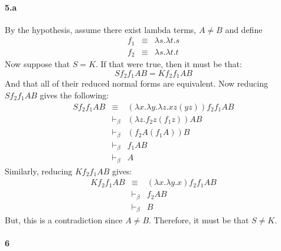 \documentclass{article}
\begin{document}
\paragraph{5.a}
By the hypothesis, assume there exist lambda terms, $A \neq B$ and define 
\begin{eqnarray*}
f_1 & \equiv & \lambda s. \lambda t. s \\
f_2 & \equiv & \lambda s. \lambda t. t
\end{eqnarray*}
Now suppose that $S = K$.  If that were true, then it must be that:
\[ S f_2 f_1 A B = K f_2 f_1 A B \]
And that all of their reduced normal forms are equivalent.  Now reducing $S f_2 f_1 A B$ gives the following:
\begin{eqnarray*}
S f_2 f_1 A B & \equiv & (\lambda x . \lambda y . \lambda z . x z (y z) ) f_2 f_1 A B \\
& \vdash_\beta & (\lambda z . f_2 z (f_1 z)) A B \\
& \vdash_\beta & (f_2 A (f_1 A)) B \\
& \vdash_\beta & f_1 A B \\
& \vdash_\beta & A
\end{eqnarray*}
Similarly, reducing $K f_2 f_1 A B$ gives:
\begin{eqnarray*}
K f_2 f_1 A B & \equiv & ( \lambda x . \lambda y . x ) f_2 f_1 A B \\
& \vdash_\beta & f_2 A B \\
& \vdash_\beta & B
\end{eqnarray*}
But, this is a contradiction since $A \neq B$.  Therefore, it must be that $S \neq K$.

\paragraph{6}
\newcommand{\Plus}{\mathop{\underline{Plus}} \:}
\newcommand{\Times}{\mathop{\underline{Times}} \:}
\newcommand{\Comb}[1]{\mathop{\underline{#1}}}
\end{document}
